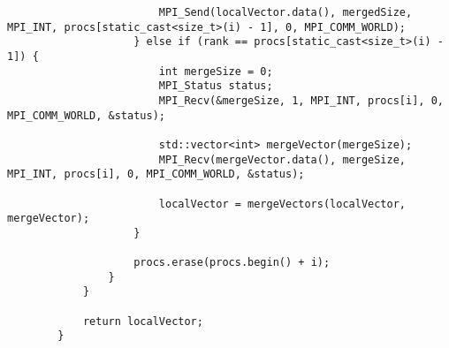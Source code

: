 \documentclass{report}
\begin{document}
\begin{lstlisting}
                        MPI_Send(localVector.data(), mergedSize, MPI_INT, procs[static_cast<size_t>(i) - 1], 0, MPI_COMM_WORLD);
                    } else if (rank == procs[static_cast<size_t>(i) - 1]) {
                        int mergeSize = 0;
                        MPI_Status status;
                        MPI_Recv(&mergeSize, 1, MPI_INT, procs[i], 0, MPI_COMM_WORLD, &status);
        
                        std::vector<int> mergeVector(mergeSize);
                        MPI_Recv(mergeVector.data(), mergeSize, MPI_INT, procs[i], 0, MPI_COMM_WORLD, &status);
        
                        localVector = mergeVectors(localVector, mergeVector);
                    }
        
                    procs.erase(procs.begin() + i);
                }
            }
        
            return localVector;
        }
\end{lstlisting}
\end{document}
